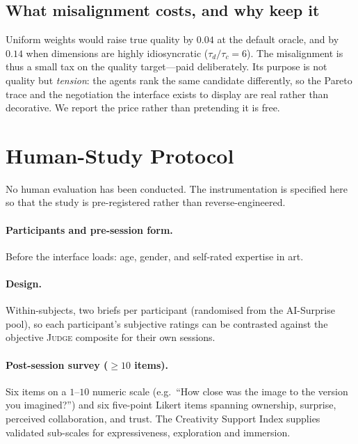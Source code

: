 \documentclass[11pt]{article}
\newcommand{\JUDGE}{\textsc{Judge}}
\theoremstyle{plain}
\theoremstyle{definition}
\begin{document}
\subsection{What misalignment costs, and why keep it}
Uniform weights would raise true quality by $0.04$ at the default oracle, and by
$0.14$ when dimensions are highly idiosyncratic ($\tau_d/\tau_c = 6$). The
misalignment is thus a small tax on the quality target---paid deliberately. Its
purpose is not quality but \emph{tension}: the agents rank the same candidate
differently, so the Pareto trace and the negotiation the interface exists to
display are real rather than decorative. We report the price rather than
pretending it is free.

\section{Human-Study Protocol}
\label{sec:human}
No human evaluation has been conducted. The instrumentation is specified here so
that the study is pre-registered rather than reverse-engineered.

\paragraph{Participants and pre-session form.}
Before the interface loads: age, gender, and self-rated expertise in art.

\paragraph{Design.}
Within-subjects, two briefs per participant (randomised from the AI-Surprise
pool), so each participant's subjective ratings can be contrasted against the
objective \JUDGE{} composite for their own sessions.

\paragraph{Post-session survey ($\ge 10$ items).}
Six items on a $1$--$10$ numeric scale (e.g.\ ``How close was the image to the
version you imagined?'') and six five-point Likert items
\citep{likert1932technique} spanning ownership, surprise, perceived
collaboration, and trust. The Creativity Support Index
\citep{cherry2014quantifying} supplies validated sub-scales for expressiveness,
exploration and immersion.
\end{document}
